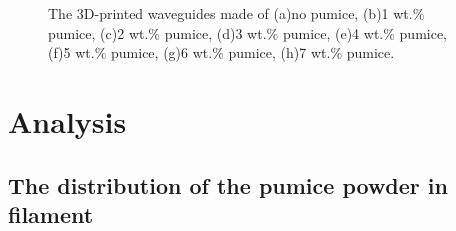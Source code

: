 \begin{figure}[htbp]
{\begin{minipage}[t]{0.35\textwidth}
		\end{minipage}
	}
  \caption[The 3D-printed waveguides]{\footnotesize The 3D-printed waveguides made of (a)no pumice, (b)1 wt.$\%$ pumice, (c)2 wt.$\%$ pumice, (d)3 wt.$\%$ pumice, (e)4 wt.$\%$ pumice, (f)5 wt.$\%$ pumice, (g)6 wt.$\%$ pumice, (h)7 wt.$\%$ pumice.}
  \label{Fig:waveguides}
\end{figure}

\section{Analysis}
\subsection{The distribution of the pumice powder in filament}

